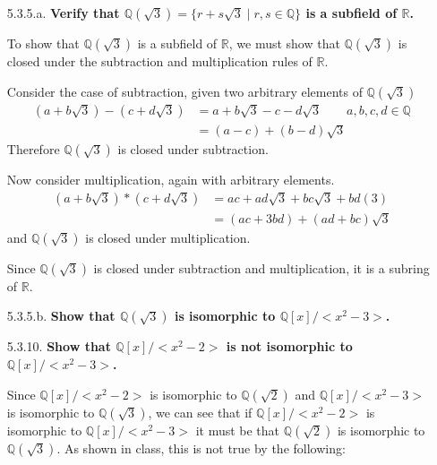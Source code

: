 \documentclass{article}
\begin{document}
\begin{enumerate}
		\item [5.3.5.a. ] \textbf{Verify that $\mathbb{Q}(\sqrt{3}) = \lbrace r + s\sqrt{3} \mid 
			r, s \in \mathbb{Q} \rbrace$ is a subfield of $\mathbb{R}$.}

			To show that $\mathbb{Q}(\sqrt{3})$ is a subfield of $\mathbb{R}$, we must show that
			$\mathbb{Q}(\sqrt{3})$ is closed under the subtraction and multiplication rules of 
			$\mathbb{R}$. 

			Consider the case of subtraction, given two arbitrary elements of $\mathbb{Q}(\sqrt{3})$
			\begin{align*}
				(a + b\sqrt{3}) - (c + d\sqrt{3}) & = a + b\sqrt{3} - c - d\sqrt{3} \qquad a, b, c,
					d \in \mathbb{Q} \\
					& = (a - c) + (b - d)\sqrt{3} 
			\end{align*}
			Therefore $\mathbb{Q}(\sqrt{3})$ is closed under subtraction.

			Now consider multiplication, again with arbitrary elements.
			\begin{align*}
				(a + b\sqrt{3}) * (c + d\sqrt{3}) & = ac + ad\sqrt{3} + bc\sqrt{3} + bd(3) \\
					& = (ac + 3bd) + (ad + bc)\sqrt{3}
			\end{align*}
			and $\mathbb{Q}(\sqrt{3})$ is closed under multiplication.

			Since $\mathbb{Q}(\sqrt{3})$ is closed under subtraction and multiplication, it is a 
			subring of $\mathbb{R}$.

		\item [5.3.5.b. ] \textbf{Show that $\mathbb{Q}(\sqrt{3})$ is isomorphic to $\mathbb{Q}[x]/
			<x^2 - 3>$.}

		\item [5.3.10. ] \textbf{Show that $\mathbb{Q}[x]/<x^2 - 2>$ is not isomorphic to 
			$\mathbb{Q}[x]/<x^2 - 3>$.}

			Since $\mathbb{Q}[x]/<x^2 - 2>$ is isomorphic to $\mathbb{Q}(\sqrt{2})$ and 
			$\mathbb{Q}[x]/<x^2 - 3>$ is isomorphic to $\mathbb{Q}(\sqrt{3})$, we can see that if
			$\mathbb{Q}[x]/<x^2 - 2>$ is isomorphic to $\mathbb{Q}[x]/<x^2 - 3>$ it must be that 
			$\mathbb{Q}(\sqrt{2})$ is isomorphic to $\mathbb{Q}(\sqrt{3})$. As shown in class, this
			is not true by the following:


\end{enumerate}
\end{document}
